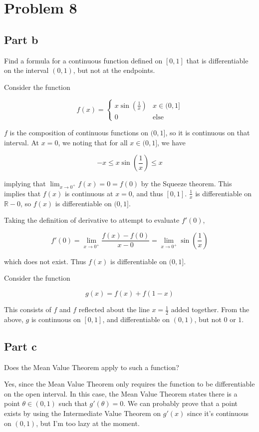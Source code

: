 \documentclass{article}
\newcommand{\R}{\mathbb{R}}
\begin{document}
\section*{Problem 8}

\subsection*{Part b}

Find a formula for a continuous function defined on $[0, 1]$ that is differentiable on the interval $(0, 1)$, but not at the endpoints.

Consider the function

\[
f(x) = 
\begin{cases}
x\sin(\frac{1}{x}) & x \in (0, 1]\\
0 & \text{else}
\end{cases}
\]

$f$ is the composition of continuous functions on $(0, 1]$, so it is continuous on that interval. At $x=0$, we noting that for all $x \in (0, 1]$, we have

\[
-x \leq x \sin(\frac{1}{x}) \leq x
\]

implying that $\lim_{x \rightarrow 0^+} f(x) = 0 = f(0)$ by the Squeeze theorem. This implies that $f(x)$ is continuous at $x=0$, and thus $[0, 1]$. $\frac{1}{x}$ is differentiable on $\R - {0}$, so $f(x)$ is differentiable on $(0, 1]$.

Taking the definition of derivative to attempt to evaluate $f'(0)$,

\[
f'(0) = \lim_{x \rightarrow 0^+} \frac{f(x) - f(0)}{x - 0} = \lim_{x \rightarrow 0^+} \sin(\frac{1}{x})
\]

which does not exist. Thus $f(x)$ is differentiable on $(0, 1]$.

Consider the function

\[
g(x) = f(x) + f(1-x)
\]

This consists of $f$ and $f$ reflected about the line $x = \frac{1}{2}$ added together. From the above, $g$ is continuous on $[0, 1]$, and differentiable on $(0, 1)$, but not $0$ or $1$.

\subsection*{Part c}

Does the Mean Value Theorem apply to such a function?

Yes, since the Mean Value Theorem only requires the function to be differentiable on the open interval. In this case, the Mean Value Theorem states there is a point $\theta \in (0, 1)$ such that $g'(\theta) = 0$. We can probably prove that a point exists by using the Intermediate Value Theorem on $g'(x)$ since it's continuous on $(0, 1)$, but I'm too lazy at the moment.
\end{document}
